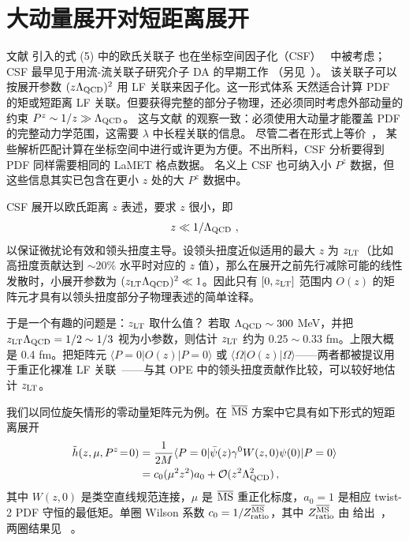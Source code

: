 \section{大动量展开对短距离展开}

文献 \cite{Ji:2013dva} 引入的式 (5) 中的欧氏关联子
也在坐标空间因子化（CSF）~\cite{Radyushkin:2017cyf} 中被考虑；CSF 最早见于用流-流关联子研究介子 DA 的早期工作
\cite{Braun:2007wv}（另见~\cite{Ma:2017pxb}）。
该关联子可以按展开参数 $(z\Lambda_{\rm QCD})^2$ 用 LF 关联来因子化。这一形式体系
天然适合计算 PDF 的矩或短距离 LF 关联。但要获得完整的部分子物理，还必须同时考虑外部动量的约束 $P^z\sim 1/z \gg \Lambda_{\rm QCD}$。
这与文献 \cite{Ji:2014gla} 的观察一致：必须使用大动量才能覆盖 PDF 的完整动力学范围，这需要 $\lambda$ 中长程关联的信息。
尽管二者在形式上等价~\cite{Ji:2017rah,Izubuchi:2018srq,Radyushkin:2017lvu}，
某些解析匹配计算在坐标空间中进行或许更为方便。不出所料，CSF 分析要得到 PDF 同样需要相同的 LaMET 格点数据。
名义上 CSF 也可纳入小 $P^z$ 数据，但这些信息其实已包含在更小 $z$ 处的大 $P^z$ 数据中。

CSF 展开以欧氏距离 $z$ 表述，要求 $z$ 很小，即
\begin{equation}
         z\ll 1/\Lambda_{\rm QCD}\ ,
\end{equation}
以保证微扰论有效和领头扭度主导。设领头扭度近似适用的最大 $z$ 为 $z_{\rm LT}$（比如高扭度贡献达到 $\sim20\%$ 水平时对应的 $z$ 值），那么在展开之前先行减除可能的线性发散时，小展开参数为 $(z_{\rm LT}\Lambda_{\rm QCD})^2\ll 1 $。因此只有 $[0, z_{\rm LT}]$ 范围内 $O(z)$ 的矩阵元才具有以领头扭度部分子物理表述的简单诠释。

于是一个有趣的问题是：$z_{\rm LT}$ 取什么值？
若取 $\Lambda_{\rm QCD}\sim 300$ MeV，并把 $z_{\rm LT}\Lambda_{\rm QCD}=1/2\sim 1/3$ 视为小参数，则估计 $z_{\rm LT}$ 约为 $0.25 \sim 0.33$ fm。上限大概是 0.4 fm。把矩阵元 $\langle P=0| O(z)|P=0\rangle$ 或 $\langle \Omega| O(z)|\Omega\rangle$——两者都被提议用于重正化裸准 LF 关联~\cite{Radyushkin:2017cyf,Braun:2018brg,Li:2020xml}——与其 OPE 中的领头扭度贡献作比较，可以较好地估计 $z_{\rm LT}$。

我们以同位旋矢情形的零动量矩阵元为例。在 ${\overline{\rm MS}}$ 方案中它具有如下形式的短距离展开~\cite{Radyushkin:2017lvu,Izubuchi:2018srq}
\begin{align}
			\tilde{h}(z,\mu,P^z\!=\!0)&= {1\over 2M}\langle P=0| \bar{\psi}(z)\gamma^0 W(z,0)\psi(0)|P=0\rangle \nonumber\\
			& = c_0(\mu^2 z^2) a_0 + {\cal O}(z^2\Lambda_{\rm QCD}^2)\,,
\end{align}
其中 $W(z,0)$ 是类空直线规范连接，$\mu$ 是 ${\overline{\rm MS}}$ 重正化标度，$a_0=1$ 是相应 twist-2 PDF 守恒的最低矩。单圈 Wilson 系数 $c_0=1/  Z^{\overline{\rm MS}}_{\rm ratio}$，其中 $Z^{\overline{\rm MS}}_{\rm ratio}$ 由  给出~\cite{Izubuchi:2018srq}，
两圈结果见 ~\cite{Li:2020xml}。

